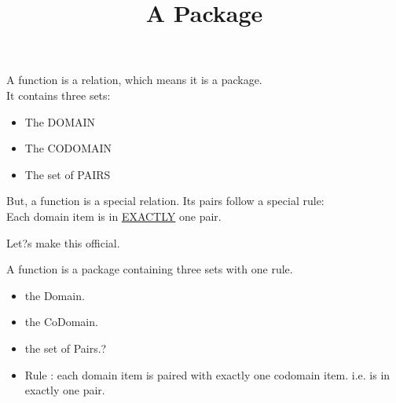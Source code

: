 \documentclass{ximera}
\title{A Package}
\begin{document}
\begin{abstract}
\end{abstract}

\maketitle





\begin{sectionOutcomes}

A function is a relation, which means it is a package.\\
It contains three sets:
\begin{itemize}
\item The DOMAIN
\item The CODOMAIN
\item The set of PAIRS
\end{itemize}
\end{sectionOutcomes}


But, a function is a special relation.  Its pairs follow a special rule: \\
Each domain item is in \underline{EXACTLY} one pair.

Let?s make this official.


\begin{definition}  
A function is a package containing three sets with one rule.
\begin{itemize}
\item the Domain. 
\item the CoDomain. 
\item the set of Pairs.?
\item Rule : each domain item is paired with exactly one codomain item.  i.e. is in exactly one pair.
\end{itemize}
\end{definition}
\end{document}
